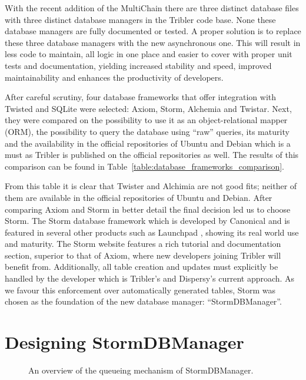 With the recent addition of the MultiChain there are three distinct database files with three distinct database managers in the Tribler code base.
None these database managers are fully documented or tested.
A proper solution is to replace these three database managers with the new asynchronous one.
This will result in less code to maintain, all logic in one place and easier to cover with proper unit tests and documentation, yielding increased stability and speed, improved maintainability and enhances the productivity of developers.

After careful scrutiny, four database frameworks that offer integration with Twisted and SQLite were selected: Axiom, Storm, Alchemia and Twistar.
Next, they were compared on the possibility to use it as an object-relational mapper (ORM), the possibility to query the database using \enquote{raw} queries, its maturity and the availability in the official repositories of Ubuntu and Debian which is a must as Tribler is published on the official repositories as well.
The results of this comparison can be found in Table~\ref{table:database_frameworks_comparison}.

From this table it is clear that Twister and Alchimia are not good fits; neither of them are available in the official repositories of Ubuntu and Debian.
After comparing Axiom and Storm in better detail the final decision led us to choose Storm.
The Storm database framework which is developed by Canonical and is featured in several other products such as Launchpad \cite{canonical2011storm}, showing its real world use and maturity.
The Storm website features a rich tutorial and documentation section, superior to that of Axiom, where new developers joining Tribler will benefit from.
Additionally, all table creation and updates must explicitly be handled by the developer which is Tribler's and Dispersy's current approach.
As we favour this enforcement over automatically generated tables, Storm was chosen as the foundation of the new database manager: \enquote{StormDBManager}.

\section{Designing StormDBManager}

\begin{figure}[h]
	\caption{An overview of the queueing mechanism of StormDBManager.}
	\label{fig:storm_db_worker}
\end{figure}

